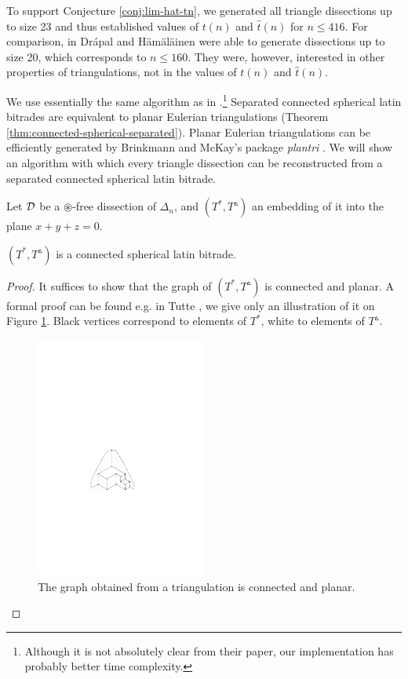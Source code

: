 To support Conjecture \ref{conj:lim-hat-tn}, we generated all triangle dissections up to size 23 and thus established values of $t(n)$ and $\hat t(n)$ for $n \leq 416$. For comparison, in \cite{DrapalHamalainen10} Drápal and Hämäläinen were able to generate dissections up to size 20, which corresponds to $n \leq 160$. They were, however, interested in other properties of triangulations, not in the values of $t(n)$ and $\hat t(n)$.

We use essentially the same algorithm as in \cite{DrapalHamalainen10}.\footnote{Although it is not absolutely clear from their paper, our implementation has probably better time complexity.} Separated connected spherical latin bitrades are equivalent to planar Eulerian triangulations (Theorem \ref{thm:connected-spherical-separated}). Planar Eulerian triangulations can be efficiently generated by Brinkmann and McKay's package \emph{plantri} \cite{BrinkmannMcKay99}. We will show an algorithm with which every triangle dissection can be reconstructed from a separated connected spherical latin bitrade.

\bigskip

Let $\mathcal D$ be a $\circledast$-free dissection of $\Delta_n$, and $(T^*, T^\vartriangle)$ an embedding of it into the plane $x+y+z=0$.

\begin{lem}
$(T^*, T^\vartriangle)$ is a connected spherical latin bitrade.
\end{lem}
\begin{proof}
It suffices to show that the graph of $(T^*, T^\vartriangle)$ is connected and planar. A formal proof can be found e.g. in Tutte \cite{Tutte48}, we give only an illustration of it on Figure \ref{fig:triangulation-graph}. Black vertices correspond to elements of $T^*$, white to elements of $T^\vartriangle$.

\begin{figure}[htb]
\centering
\includegraphics[width=0.5\textwidth]{img/triangulation_graph.pdf}
\caption{The graph obtained from a triangulation is connected and planar.}
\label{fig:triangulation-graph}
\end{figure}
\end{proof}

